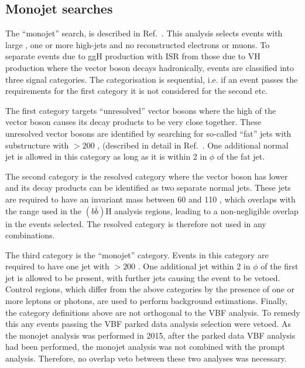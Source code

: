 
\subsection{Monojet searches}
\label{sec:monojet}
The ``monojet'' search, is described in Ref.~\cite{CMS-PAS-EXO-12-055}. This analysis selects events with large \MET, one or more high-\pt jets and no reconstructed electrons or muons. To separate events due to \ac{ggH} production with \ac{ISR} from those due to \ac{VH} production where the vector boson decays hadronically, events are classified into three signal categories. The categorisation is sequential, i.e. if an event passes the requirements for the first category it is not considered for the second etc. 

The first category targets ``unresolved'' vector bosons where the high \pt of the vector boson causes its decay products to be very close together. These unresolved vector bosons are identified by searching for so-called ``fat'' jets with substructure with \pt$>200$ \GeV, (described in detail in Ref.~\cite{CMS-PAS-EXO-12-055}. One additional normal jet is allowed in this category as long as it is within 2 in $\phi$ of the fat jet.

The second category is the resolved category where the vector boson has lower \pt and its decay products can be identified as two separate normal jets. These jets are required to have an invariant mass between 60 and 110 \GeV, which overlaps with the range used in the \PZ$(b\bar{b})$H analysis regions, leading to a non-negligible overlap in the events selected. The resolved category is therefore not used in any combinations.

The third category is the ``monojet'' category. Events in this category are required to have one jet with \pt$>200$ \GeV. One additional jet within 2 in $\phi$ of the first jet is allowed to be present, with further jets causing the event to be vetoed. Control regions, which differ from the above categories by the presence of one or more leptons or photons, are used to perform background estimations. Finally, the category definitions above are not orthogonal to the \ac{VBF} analysis. To remedy this any events passing the \ac{VBF} parked data analysis selection were vetoed. As the monojet analysis was performed in 2015, after the parked data \ac{VBF} analysis had been performed, the monojet analysis was not combined with the prompt analysis. Therefore, no overlap veto between these two analyses was necessary.

